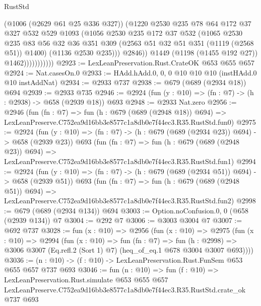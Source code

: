 \begin{lexlean}{RustStd}
\begin{coremodule}
                            (@1006 (@2629 @61 @25 @336 @327))
                            (@1220
                              @2530
                              @235
                              @78
                              @64
                              @172
                              @37
                              @327
                              @532
                              @529
                              @1093
                              (@1056
                                @2530
                                @235
                                @172
                                @37
                                @532
                                (@1065
                                  @2530
                                  @235
                                  @83
                                  @56
                                  @32
                                  @36
                                  @351
                                  @309
                                  (@2563 @51 @32 @51 @351 (@1119 (@2568 @51)) @1400)
                                  (@1136 @2530 @235)))
                              @2846))
                          @1449
                          (@1198 (@1455 @192 @27))
                          @1462)))))))))))
@2923 := LexLeanPreservation.Rust.CrateOK @653 @655 @657
@2924 := Nat.casesOn.{0}
@2933 := HAdd.hAdd.{0, 0, 0} @10 @10 @10 (instHAdd.{0} @10 instAddNat)
@2934 := @2933 @737
@2938 := @679 (@689 (@2934 @18)) @694
@2939 := @2933 @735
@2946 := @2924 (fun (y : @10) => (fn : @7) -> (h : @2938) -> @658 (@2939 @18)) @693
@2948 := @2933 Nat.zero
@2956 := @2946
    (fun (fn : @7) =>
    fun (h : @679 (@689 (@2948 @18)) @694) =>
    LexLeanPreserve.C752ea9d16bb3e8577c1a8db0e7f44ec3.R35.RustStd.fun0)
@2975 := @2924
    (fun (y : @10) => (fn : @7) -> (h : @679 (@689 (@2934 @23)) @694) -> @658 (@2939 @23))
    @693
    (fun (fn : @7) =>
    fun (h : @679 (@689 (@2948 @23)) @694) =>
    LexLeanPreserve.C752ea9d16bb3e8577c1a8db0e7f44ec3.R35.RustStd.fun1)
@2994 := @2924
    (fun (y : @10) => (fn : @7) -> (h : @679 (@689 (@2934 @51)) @694) -> @658 (@2939 @51))
    @693
    (fun (fn : @7) =>
    fun (h : @679 (@689 (@2948 @51)) @694) =>
    LexLeanPreserve.C752ea9d16bb3e8577c1a8db0e7f44ec3.R35.RustStd.fun2)
@2998 := @679 (@689 (@2934 @134)) @694
@3003 := Option.noConfusion.{0, 0} (@658 (@2939 @134)) @7
@3004 := @292 @7
@3006 := @3003 @3004 @7
@3007 := @692 @737
@3028 := fun (x : @10) =>
  @2956
    (fun (x : @10) =>
    @2975
      (fun (x : @10) =>
      @2994
        (fun (x : @10) =>
        fun (fn : @7) =>
        fun (h : @2998) =>
        @3006 @3007 (Eq.refl.{2} (Sort 1) @7) (heq_of_eq.{1} @678 @3004 @3007 @693))))
@3036 := (n : @10) -> (f : @10) -> LexLeanPreservation.Rust.FunSem @653 @655 @657 @737 @693
@3046 := fun (n : @10) =>
  fun (f : @10) =>
  LexLeanPreservation.Rust.simulate
    @653
    @655
    @657
    LexLeanPreserve.C752ea9d16bb3e8577c1a8db0e7f44ec3.R35.RustStd.crate_ok
    @737
    @693
\end{coremodule}
\end{lexlean}
